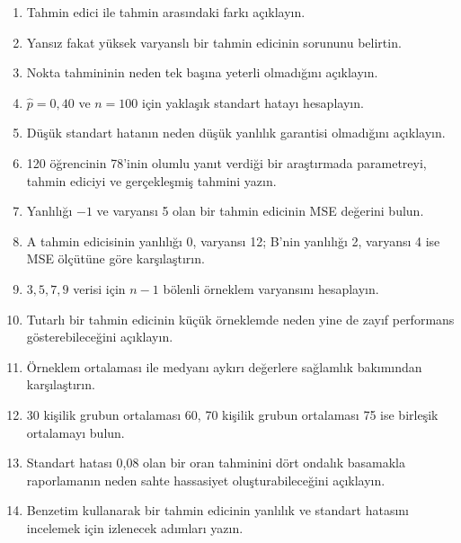 \begin{enumerate}
  \item Tahmin edici ile tahmin arasındaki farkı açıklayın.
  \item Yansız fakat yüksek varyanslı bir tahmin edicinin sorununu belirtin.
  \item Nokta tahmininin neden tek başına yeterli olmadığını açıklayın.
  \item $\hat p=0{,}40$ ve $n=100$ için yaklaşık standart hatayı hesaplayın.
  \item Düşük standart hatanın neden düşük yanlılık garantisi olmadığını açıklayın.
  \item 120 öğrencinin 78'inin olumlu yanıt verdiği bir araştırmada parametreyi,
  tahmin ediciyi ve gerçekleşmiş tahmini yazın.
  \item Yanlılığı $-1$ ve varyansı 5 olan bir tahmin edicinin MSE değerini bulun.
  \item A tahmin edicisinin yanlılığı 0, varyansı 12; B'nin yanlılığı 2,
  varyansı 4 ise MSE ölçütüne göre karşılaştırın.
  \item $3,5,7,9$ verisi için $n-1$ bölenli örneklem varyansını hesaplayın.
  \item Tutarlı bir tahmin edicinin küçük örneklemde neden yine de zayıf
  performans gösterebileceğini açıklayın.
  \item Örneklem ortalaması ile medyanı aykırı değerlere sağlamlık bakımından
  karşılaştırın.
  \item 30 kişilik grubun ortalaması 60, 70 kişilik grubun ortalaması 75 ise
  birleşik ortalamayı bulun.
  \item Standart hatası 0,08 olan bir oran tahminini dört ondalık basamakla
  raporlamanın neden sahte hassasiyet oluşturabileceğini açıklayın.
  \item Benzetim kullanarak bir tahmin edicinin yanlılık ve standart hatasını
  incelemek için izlenecek adımları yazın.
\end{enumerate}
